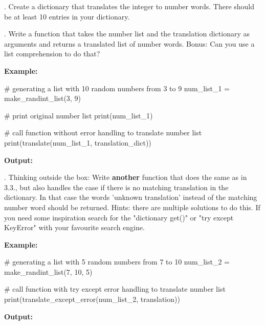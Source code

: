 . Create a dictionary that translates the integer to number words. There should be at least 10 entries in your dictionary.
\vspace{1em}

. Write a function that takes the number list and the translation dictionary as arguments and returns a translated list of number words. Bonus: Can you use a list comprehension to do that?
\vspace{1em}


\noindent \textbf{Example:}

\begin{pythoncode}
# generating a list with 10 random numbers from 3 to 9
num_list_1 = make_randint_list(3, 9)

# print original number list
print(num_list_1)

# call function without error handling to translate number list
print(translate(num_list_1, translation_dict))
\end{pythoncode}

\noindent \textbf{Output:}
\begin{outputcode}
\end{outputcode}

\vspace{1em}
. Thinking outside the box: Write \textbf{another} function that does the same as in 3.3., but also handles the case if there is no matching translation in the dictionary.
In that case the words 'unknown translation' instead of the matching number word should be returned.
Hints: there are multiple solutions to do this. If you need some inspiration search for the "dictionary get()" or "try except KeyError" with your favourite search engine.
\vspace{1em}

\noindent \textbf{Example:}

\begin{pythoncode}
# generating a list with 5 random numbers from 7 to 10
num_list_2 = make_randint_list(7, 10, 5)

# call function with try except error handling to translate number list
print(translate_except_error(num_list_2, translation))
\end{pythoncode}

\noindent \textbf{Output:}
\begin{outputcode}
\end{outputcode}

